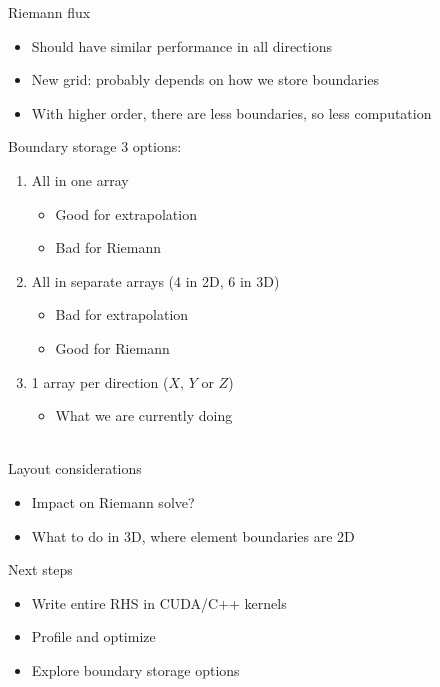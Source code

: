 \documentclass{beamer}
\begin{document}
\begin{frame}{Riemann flux}
\begin{itemize}
    \item Should have similar performance in all directions
    \item New grid: probably depends on how we store boundaries
    \item With higher order, there are less boundaries, so less computation
\end{itemize}
\end{frame}

\begin{frame}{Boundary storage}
3 options:
    \begin{enumerate}
        \item All in one array
            \begin{itemize}
                \item Good for extrapolation
                \item Bad for Riemann
            \end{itemize}
        \item All in separate arrays (4 in 2D, 6 in 3D)
            \begin{itemize}
                \item Bad for extrapolation
                \item Good for Riemann
            \end{itemize}
        \item 1 array per direction ($X$, $Y$ or $Z$)
            \begin{itemize} \item What we are currently doing \end{itemize}
    \end{enumerate}

~\\
Layout considerations
    \begin{itemize}
        \item Impact on Riemann solve?
        \item What to do in 3D, where element boundaries are 2D
    \end{itemize}
\end{frame}

\begin{frame}{Next steps}
\begin{itemize}
    \item Write entire RHS in CUDA/C++ kernels
    \item Profile and optimize
    \item Explore boundary storage options
\end{itemize}
\end{frame}
\end{document}
